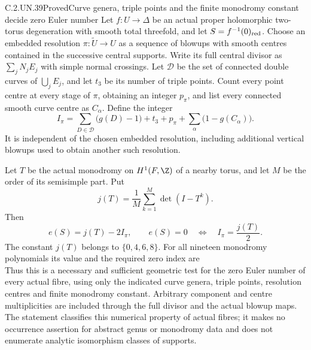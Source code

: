 \begin{statement}{C.2.UN.39}{Proved}{Curve genera, triple points and the finite monodromy constant decide zero Euler number}
Let $f:U\to\Delta$ be an actual proper holomorphic
two-torus degeneration with smooth total threefold,
and let $S=f^{-1}(0)_{\rm red}$. Choose an embedded
resolution $\pi:\widetilde U\to U$ as a sequence
of blowups with smooth centres contained in the
successive central supports. Write its full
central divisor as $\sum_jN_jE_j$ with simple
normal crossings. Let $\mathcal D$ be the set
of connected double curves of $\bigcup_jE_j$,
and let $t_3$ be its number of triple points.
Count every point centre at every stage of
$\pi$, obtaining an integer $p_\pi$, and list
every connected smooth curve centre as $C_\alpha$.
Define the integer
\[
 I_\pi=
     \sum_{D\in\mathcal D}\bigl(g(D)-1\bigr)+t_3
       +p_\pi+\sum_\alpha\bigl(1-g(C_\alpha)\bigr).
                                                               \tag{C.ZC.1}
\]
It is independent of the chosen embedded
resolution, including additional vertical
blowups used to obtain another such resolution.

Let $T$ be the actual monodromy on $H^1(F,\Z)$
of a nearby torus, and let $M$ be the order of
its semisimple part. Put
\[
             j(T)=\frac1M\sum_{k=1}^{M}\det(I-T^k).
                                                               \tag{C.ZC.2}
\]
Then
\[
                e(S)=j(T)-2I_\pi,\qquad
                e(S)=0\quad\Longleftrightarrow\quad
                         I_\pi=\frac{j(T)}2 .        \tag{C.ZC.3}
\]
The constant $j(T)$ belongs to $\{0,4,6,8\}$.
For all nineteen monodromy polynomials its
value and the required zero index are
\[
 
                                                               \tag{C.ZC.4}
\]
Thus this is a necessary and sufficient
geometric test for the zero Euler number of
every actual fibre, using only the indicated
curve genera, triple points, resolution centres
and finite monodromy constant. Arbitrary
component and centre multiplicities are
included through the full divisor and the
actual blowup maps. The statement classifies
this numerical property of actual fibres;
it makes no occurrence assertion for abstract
genus or monodromy data and does not enumerate
analytic isomorphism classes of supports.
\end{statement}


